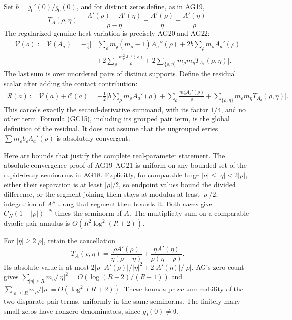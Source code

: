 \documentclass[
  10pt,
  a4paper,
]{article}
\begin{document}
Set \(b=g_0'(0)/g_0(0)\), and for distinct zeros define, as in AG19, \[
T_A(\rho,\eta)=
\frac{A'(\rho)-A'(\eta)}{\rho-\eta}
+\frac{A'(\rho)}{\eta}+\frac{A'(\eta)}{\rho}.
\tag{GC13}
\] The regularized genuine-heat variation is precisely AG20 and AG22: \[
\begin{aligned}
\mathcal V(a):=\mathcal V(A_a)
=-\frac14\Bigg[&
\sum_\rho m_\rho(m_\rho-1)A_a''(\rho)
+2b\sum_\rho m_\rho A_a'(\rho)\\
&+2\sum_\rho\frac{m_\rho^2 A_a'(\rho)}{\rho}
+2\sum_{\{\rho,\eta\}}m_\rho m_\eta T_{A_a}(\rho,\eta)
\Bigg].
\end{aligned}
\tag{GC14}
\] The last sum is over unordered pairs of distinct supports. Define the
residual scalar after adding the contact contribution: \[
\boxed{
\begin{aligned}
\mathcal R(a):=\mathcal V(a)+\mathcal C(a)
=-\frac12\Bigg[
b\sum_\rho m_\rho A_a'(\rho)
+\sum_\rho\frac{m_\rho^2 A_a'(\rho)}{\rho}
+\sum_{\{\rho,\eta\}}m_\rho m_\eta T_{A_a}(\rho,\eta)
\Bigg].
\end{aligned}}
\tag{GC15}
\] This cancels exactly the second-derivative summand, with its factor
\(1/4\), and no other term. Formula (GC15), including its grouped pair
term, is the global definition of the residual. It does not assume that
the ungrouped series \(\sum m_\rho b_\rho A_a'(\rho)\) is absolutely
convergent.

Here are bounds that justify the complete real-parameter statement. The
absolute-convergence proof of AG19--AG21 is uniform on any bounded set
of the rapid-decay seminorms in AG18. Explicitly, for comparable large
\(|\rho|\le|\eta|<2|\rho|\), either their separation is at least
\(|\rho|/2\), so endpoint values bound the divided difference, or the
segment joining them stays at modulus at least \(|\rho|/2\); integration
of \(A''\) along that segment then bounds it. Both cases give
\(C_N(1+|\rho|)^{-N}\) times the seminorm of \(A\). The multiplicity sum
on a comparable dyadic pair annulus is \(O(R^2\log^2(R+2))\).

For \(|\eta|\ge2|\rho|\), retain the cancellation \[
T_A(\rho,\eta)=
\frac{\rho A'(\rho)}{\eta(\rho-\eta)}
+\frac{\eta A'(\eta)}{\rho(\eta-\rho)}.
\tag{GC16}
\] Its absolute value is at most
\(2|\rho||A'(\rho)|/|\eta|^2+2|A'(\eta)|/|\rho|\). AG's zero count gives
\(\sum_{|\eta|\ge R}m_\eta/|\eta|^2=O(\log(R+2)/(R+1))\) and
\(\sum_{|\rho|\le R}m_\rho/|\rho|=O(\log^2(R+2))\). These bounds prove
summability of the two disparate-pair terms, uniformly in the same
seminorms. The finitely many small zeros have nonzero denominators,
since \(g_0(0)\ne0\).
\end{document}
